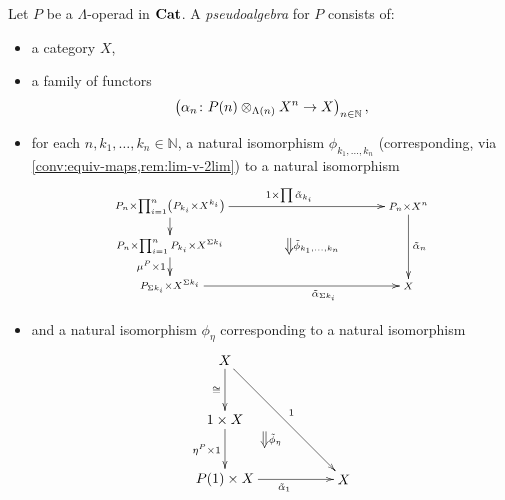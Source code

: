 \begin{Defi}\label{def:ps-alg-lop}
Let $P$ be a $\Lambda$-operad in $\mathbf{Cat}$. A \textit{pseudoalgebra} for $P$ consists of: 
    \begin{itemize}
        \item a category $X$,
        \item a family of functors
            \[
                \left(\alpha_n \colon P(n) \otimes_{\Lambda(n)} X^{n} \rightarrow X \right)_{n \in \mathbb{N}},
            \]
        \item for each $n, k_1, \ldots, k_n \in \mathbb{N}$, a natural isomorphism $\phi_{k_1, \ldots, k_n}$ (corresponding, via \cref{conv:equiv-maps,rem:lim-v-2lim}) to a natural isomorphism
            \[
                \xy
                    (0,0)*+{\scriptstyle P_n \times \prod_{i=1}^n \left(P_{k_i} \times X^{k_i}\right)}="00";
                    (0,-10)*+{\scriptstyle P_n \times \prod_{i=1}^n P_{k_i} \times X^{\Sigma k_i}}="01";
                    (0,-20)*+{\scriptstyle P_{\Sigma k_i} \times X^{\Sigma k_i}}="02";
                    (60,-20)*+{\scriptstyle X}="12";
                    (60,0)*+{\scriptstyle P_n \times X^n}="11";
                    {\ar_{} "00" ; "01"};
                    {\ar^{1 \times \prod \tilde{\alpha}_{k_i}} "00" ; "11"};
                    {\ar^{\tilde{\alpha}_n} "11" ; "12"};
                    {\ar_{\mu^P \times 1} "01" ; "02"};
                    {\ar_>>>>>>>>>>>>>>>>>>>{\tilde{\alpha}_{\Sigma k_i}} "02" ; "12"};
                    {\ar@{=>}^{\tilde{\phi}_{k_1, \ldots, k_n}} (30,-8) ; (30,-12)};
                \endxy
            \]

               \item and a natural isomorphism $\phi_{\eta}$ corresponding to a natural isomorphism
            \[
                \xy
                    (0,0)*+{X}="00";
                    (0,-15)*+{1 \times X}="x10";
                    (0,-30)*+{P(1) \times X}="10";
                    (30,-30)*+{X}="11";
                    {\ar_{\eta^P \times 1} "x10" ; "10"};
                    {\ar_{\tilde{\alpha}_1} "10" ; "11"};
                    {\ar^{1} "00" ; "11"};
                    {\ar_{\cong} "00" ; "x10"};
                    {\ar@{=>}^{\tilde{\phi}_\eta} (10,-18) ; (10,-22)};
                \endxy
            \]


\end{itemize}
\end{Defi}
